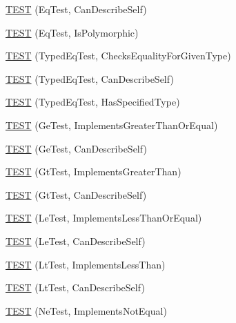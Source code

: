 \begin{DoxyCompactItemize}
\item 
\hyperlink{namespacetesting_1_1gmock__matchers__test_a1c86e845cb44f34eeac4863041c871c6}{T\+E\+ST} (Eq\+Test, Can\+Describe\+Self)
\item 
\hyperlink{namespacetesting_1_1gmock__matchers__test_ac3ea755ba2a8bb480cee70aa37ccafc2}{T\+E\+ST} (Eq\+Test, Is\+Polymorphic)
\item 
\hyperlink{namespacetesting_1_1gmock__matchers__test_a3e8d6cc259c1410a85572bc773bb21b9}{T\+E\+ST} (Typed\+Eq\+Test, Checks\+Equality\+For\+Given\+Type)
\item 
\hyperlink{namespacetesting_1_1gmock__matchers__test_a9baf261536023ac58ed65cdafcaf1602}{T\+E\+ST} (Typed\+Eq\+Test, Can\+Describe\+Self)
\item 
\hyperlink{namespacetesting_1_1gmock__matchers__test_ae0255a5de2ef537512379c3f8ff9e34f}{T\+E\+ST} (Typed\+Eq\+Test, Has\+Specified\+Type)
\item 
\hyperlink{namespacetesting_1_1gmock__matchers__test_a7d73fdbbee36ccf241ec6e328175655b}{T\+E\+ST} (Ge\+Test, Implements\+Greater\+Than\+Or\+Equal)
\item 
\hyperlink{namespacetesting_1_1gmock__matchers__test_a2718c8d5456b62ab7b060b2723939a72}{T\+E\+ST} (Ge\+Test, Can\+Describe\+Self)
\item 
\hyperlink{namespacetesting_1_1gmock__matchers__test_a87a9ac189a12e0b85964f03b3b9998b1}{T\+E\+ST} (Gt\+Test, Implements\+Greater\+Than)
\item 
\hyperlink{namespacetesting_1_1gmock__matchers__test_a2981bbdbf9cbd8864a6dde4ff4b06050}{T\+E\+ST} (Gt\+Test, Can\+Describe\+Self)
\item 
\hyperlink{namespacetesting_1_1gmock__matchers__test_af0cd1cfc3ff1272bfe06f31c5eb3ab8b}{T\+E\+ST} (Le\+Test, Implements\+Less\+Than\+Or\+Equal)
\item 
\hyperlink{namespacetesting_1_1gmock__matchers__test_a463bc4f6cdca489c05ad691e1254e2f3}{T\+E\+ST} (Le\+Test, Can\+Describe\+Self)
\item 
\hyperlink{namespacetesting_1_1gmock__matchers__test_a9f332401730e637d5c3923924dc339e3}{T\+E\+ST} (Lt\+Test, Implements\+Less\+Than)
\item 
\hyperlink{namespacetesting_1_1gmock__matchers__test_ae29bb32c74970fc22e7ac5d86e7e6c26}{T\+E\+ST} (Lt\+Test, Can\+Describe\+Self)
\item 
\hyperlink{namespacetesting_1_1gmock__matchers__test_a7319f919e57cf349f733bbdb56177daf}{T\+E\+ST} (Ne\+Test, Implements\+Not\+Equal)
\item 

\end{DoxyCompactItemize}
